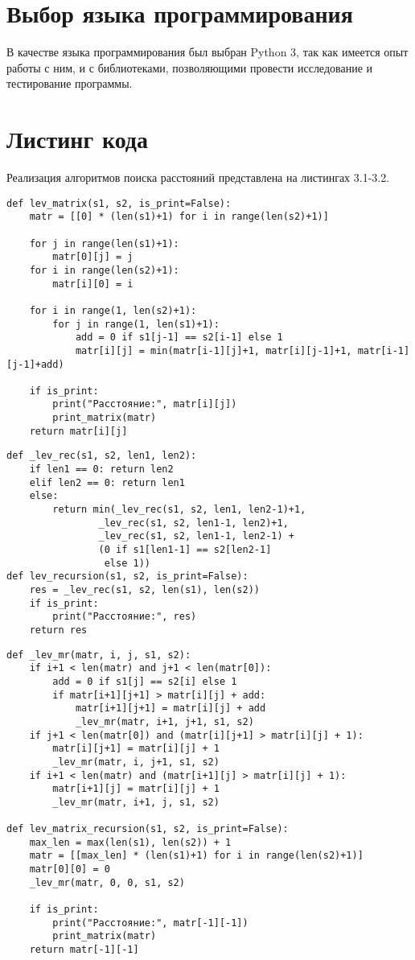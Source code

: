 \section{Выбор языка программирования}
В качестве языка программирования был выбран Python 3, так как имеется опыт работы с ним, и с библиотеками, позволяющими провести исследование и тестирование программы.


\section{Листинг кода}
Реализация алгоритмов поиска расстояний представлена на листингах 3.1-3.2.

\begin{lstlisting}[caption = Функция нахождения расстояния Левенштейна матричным методом.]
def lev_matrix(s1, s2, is_print=False):
	matr = [[0] * (len(s1)+1) for i in range(len(s2)+1)]
	
	for j in range(len(s1)+1):
		matr[0][j] = j
	for i in range(len(s2)+1):
		matr[i][0] = i
	
	for i in range(1, len(s2)+1):
		for j in range(1, len(s1)+1):
			add = 0 if s1[j-1] == s2[i-1] else 1
			matr[i][j] = min(matr[i-1][j]+1, matr[i][j-1]+1, matr[i-1][j-1]+add)
	
	if is_print:
		print("Расстояние:", matr[i][j])
		print_matrix(matr)
	return matr[i][j]
\end{lstlisting}
\newpage

\begin{lstlisting}[caption = Функции нахождения расстояния Левенштейна рекурсивным методом.]
def _lev_rec(s1, s2, len1, len2):
	if len1 == 0: return len2
	elif len2 == 0: return len1
	else:
		return min(_lev_rec(s1, s2, len1, len2-1)+1,
				_lev_rec(s1, s2, len1-1, len2)+1,
				_lev_rec(s1, s2, len1-1, len2-1) + 
				(0 if s1[len1-1] == s2[len2-1]
				 else 1))
def lev_recursion(s1, s2, is_print=False):
	res = _lev_rec(s1, s2, len(s1), len(s2))
	if is_print:
		print("Расстояние:", res)
	return res
\end{lstlisting}

\begin{lstlisting}[caption = Функции нахождения расстояния Левенштейна рекурсивным методом с заполнением матрицы.]
def _lev_mr(matr, i, j, s1, s2):
	if i+1 < len(matr) and j+1 < len(matr[0]):
		add = 0 if s1[j] == s2[i] else 1
		if matr[i+1][j+1] > matr[i][j] + add:
			matr[i+1][j+1] = matr[i][j] + add
			_lev_mr(matr, i+1, j+1, s1, s2)
	if j+1 < len(matr[0]) and (matr[i][j+1] > matr[i][j] + 1):
		matr[i][j+1] = matr[i][j] + 1
		_lev_mr(matr, i, j+1, s1, s2)
	if i+1 < len(matr) and (matr[i+1][j] > matr[i][j] + 1):
		matr[i+1][j] = matr[i][j] + 1
		_lev_mr(matr, i+1, j, s1, s2)

def lev_matrix_recursion(s1, s2, is_print=False):
	max_len = max(len(s1), len(s2)) + 1
	matr = [[max_len] * (len(s1)+1) for i in range(len(s2)+1)]
	matr[0][0] = 0
	_lev_mr(matr, 0, 0, s1, s2)
	
	if is_print:
		print("Расстояние:", matr[-1][-1])
		print_matrix(matr)
	return matr[-1][-1]
\end{lstlisting}


